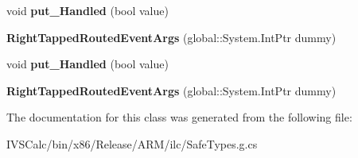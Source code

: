 \begin{DoxyCompactItemize}
void {\bfseries put\+\_\+\+Handled} (bool value)
\item 
\mbox{\label{class_windows_1_1_u_i_1_1_xaml_1_1_input_1_1_right_tapped_routed_event_args_a86a9a19ec9dc0789eae6b3a97a02aa52}} 
{\bfseries Right\+Tapped\+Routed\+Event\+Args} (global\+::\+System.\+Int\+Ptr dummy)
\item 
\mbox{\label{class_windows_1_1_u_i_1_1_xaml_1_1_input_1_1_right_tapped_routed_event_args_a0e89209671eb9ffc5ecc3d64f5982adb}} 
void {\bfseries put\+\_\+\+Handled} (bool value)
\item 
\mbox{\label{class_windows_1_1_u_i_1_1_xaml_1_1_input_1_1_right_tapped_routed_event_args_a86a9a19ec9dc0789eae6b3a97a02aa52}} 
{\bfseries Right\+Tapped\+Routed\+Event\+Args} (global\+::\+System.\+Int\+Ptr dummy)
\end{DoxyCompactItemize}


The documentation for this class was generated from the following file\+:\begin{DoxyCompactItemize}
\item 
I\+V\+S\+Calc/bin/x86/\+Release/\+A\+R\+M/ilc/Safe\+Types.\+g.\+cs\end{DoxyCompactItemize}

